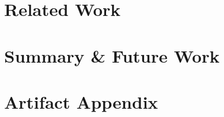 \documentclass[conference]{IEEEtran}
\begin{document}
%


\section{Related Work}
\label{sec:related}



\section{Summary \& Future Work}
\label{sec:summary}






\appendix
\section{Artifact Appendix}

\end{document}
